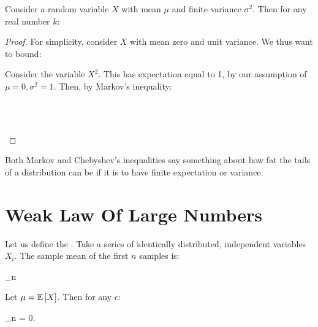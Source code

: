 \documentclass[11pt, oneside]{amsart}
\newcommand{\meanX}{\overline{X}}
\begin{document}
\begin{theorem} Consider a random variable $X$
  with mean $\mu$ and finite variance $\sigma^2$. Then for any real
  number $k$:

  \begin{nedqn}
     \leq {}
  \end{nedqn}
\end{theorem}

\begin{proof}
  For simplicity, consider $X$ with mean zero and unit variance. We thus
  want to bound:

  \begin{nedqn}
  \end{nedqn}

  Consider the variable $X^2$. This has expectation equal to 1, by our
  assumption of $\mu = 0, \sigma^2 = 1$. Then, by Markov's inequality:

  \begin{nedqn}
     \leq {}
  \\
     \leq {}
  \\
     \leq {}
  \end{nedqn}
\end{proof}

\begin{remark}
  Both Markov and Chebyshev's inequalities say something about how fat
  the tails of a distribution can be if it is to have finite expectation
  or variance.
\end{remark}

\section{Weak Law Of Large Numbers}

\begin{definition}
  Let us define the . Take a series of identically
  distributed, independent variables $X_i$. The sample mean of the first
  $n$ samples is:

  \begin{nedqn}
    \meanX_n
  \eqcol
     
  \end{nedqn}
\end{definition}

\begin{theorem}
  Let $\mu = \mathbb{E} \left[ {X} \right]$. Then for any $\epsilon$:

  \begin{nedqn}
    \lim_{n\to\infty} \Pr{\abs{\meanX_n - \mu} > \epsilon} = 0.
  \end{nedqn}
\end{theorem}
\end{document}

